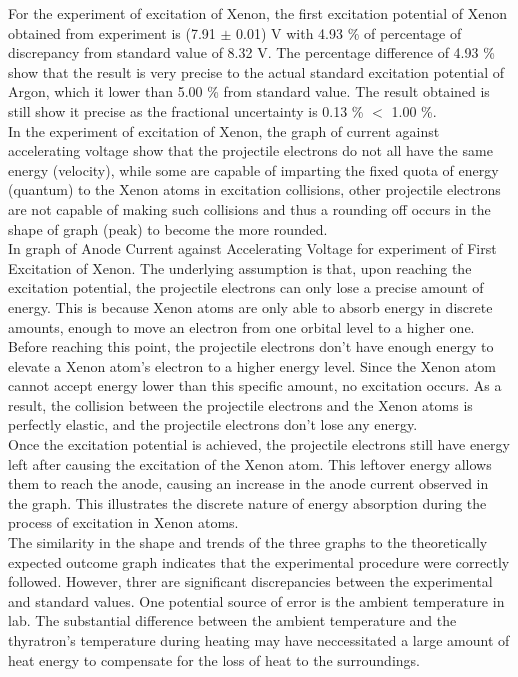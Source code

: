 \documentclass[a4paper,11pt]{article}
\begin{document}
For the experiment of excitation of Xenon, the first excitation potential of Xenon obtained from experiment is (7.91 $\pm$ 0.01) V with 4.93 \% of percentage of discrepancy from standard value of 8.32 V. The percentage difference of 4.93 \% show that the result is very precise to the 
actual standard excitation potential of Argon, which it lower than 5.00 \% from standard value. The result obtained is still show it precise as the fractional uncertainty is 0.13 \% $<$ 1.00 \%.\\

In the experiment of excitation of Xenon, the graph of current against accelerating voltage show that the projectile electrons do not all have the same energy (velocity), while some are capable of imparting the fixed quota of energy (quantum) to the Xenon atoms in excitation collisions, other projectile electrons are not capable of making such collisions and thus a rounding off
occurs in the shape of graph (peak) to become the more rounded.\\

In graph of Anode Current against Accelerating Voltage for experiment of First Excitation of Xenon. The underlying assumption is that, upon reaching the excitation potential, the projectile electrons can only lose a precise amount of energy. This is because Xenon atoms are only able to absorb energy in discrete amounts, enough to move an electron from one orbital level to a higher one.\\

Before reaching this point, the projectile electrons don't have enough energy to elevate a Xenon atom's electron to a higher energy level. Since the Xenon atom cannot accept energy lower than this specific amount, no excitation occurs. As a result, the collision between the projectile electrons and the Xenon atoms is perfectly elastic, and the projectile electrons don’t lose any energy.\\

Once the excitation potential is achieved, the projectile electrons still have energy left after causing the excitation of the Xenon atom. This leftover energy allows them to reach the anode, causing an increase in the anode current observed in the graph. This illustrates the discrete nature of energy absorption during the process of excitation in Xenon atoms.\\

The similarity in the shape and trends of the three graphs to the theoretically expected outcome graph indicates that the experimental procedure were correctly followed. However, threr are significant discrepancies between the experimental and standard values. One potential source of error is the ambient temperature in lab. The substantial difference between the ambient temperature and the thyratron's temperature during heating may have neccessitated a large amount of heat energy to compensate for the loss of heat to the surroundings.\\
\end{document}
